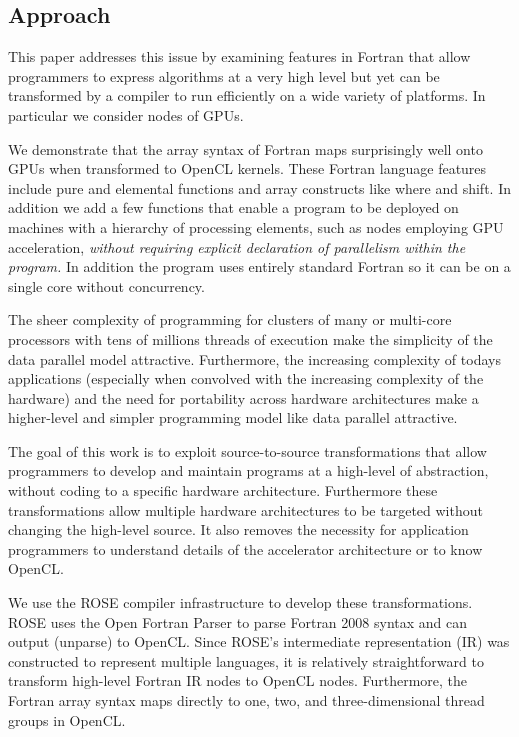 \documentclass[10pt, conference, compsocconf]{IEEEtran}
\begin{document}
\subsection{Approach}

This paper addresses this issue by examining features in Fortran that
allow programmers to express algorithms at a very high level but yet
can be transformed by a compiler to run efficiently on a wide variety
of platforms.  In particular we consider nodes of GPUs.

We demonstrate that the array syntax of Fortran maps surprisingly well
onto GPUs when transformed to OpenCL kernels.  These Fortran language
features include pure and elemental functions and array constructs
like where and shift.  In addition we add a few functions that enable
a program to be deployed on machines with a hierarchy of processing
elements, such as nodes employing GPU acceleration, \emph{without
  requiring explicit declaration of parallelism within the program.}
In addition the program uses entirely standard Fortran so it can be on
a single core without concurrency.

The sheer complexity of programming for clusters of many or multi-core
processors with tens of millions threads of execution make the simplicity of
the data parallel model attractive.  Furthermore, the increasing complexity of
todays applications (especially when convolved with the increasing complexity
of the hardware) and the need for portability across hardware architectures
make a higher-level and simpler programming model like data parallel
attractive.

The goal of this work is to exploit source-to-source transformations that
allow programmers to develop and maintain programs at a high-level of
abstraction, without coding to a specific hardware architecture.
Furthermore these transformations allow multiple hardware architectures
to be targeted without changing the high-level source.  It also removes the
necessity for application programmers to understand details of the accelerator
architecture or to know OpenCL.

We use the ROSE compiler infrastructure \cite{} to develop these
transformations.  ROSE uses the Open Fortran Parser \cite{} to parse Fortran
2008 syntax and can output (unparse) to OpenCL.  Since ROSE's intermediate
representation (IR) was constructed to represent multiple languages, it is
relatively straightforward to transform high-level Fortran IR nodes to OpenCL
nodes.  Furthermore, the Fortran array syntax maps directly to one, two, and
three-dimensional thread groups in OpenCL.
\end{document}

